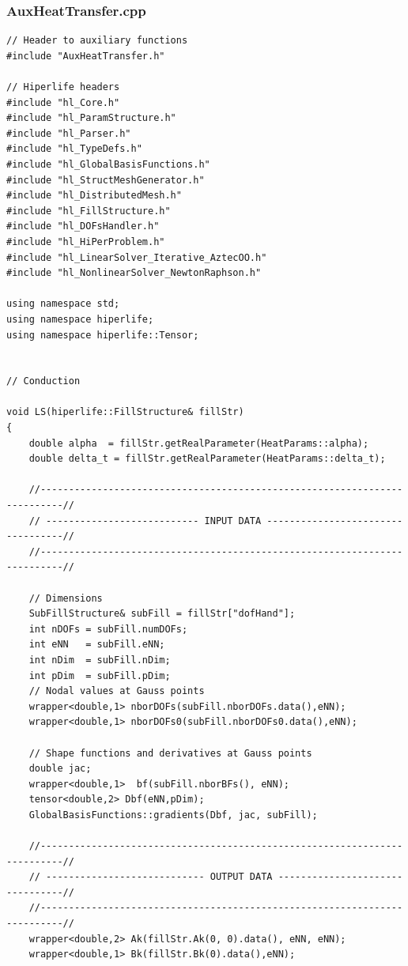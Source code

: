\documentclass[]{article}
\begin{document}
\subsubsection{AuxHeatTransfer.cpp} \label{sec: a.cpp}
\begin{lstlisting}
// Header to auxiliary functions
#include "AuxHeatTransfer.h"

// Hiperlife headers
#include "hl_Core.h"
#include "hl_ParamStructure.h"
#include "hl_Parser.h"
#include "hl_TypeDefs.h"                                                                         
#include "hl_GlobalBasisFunctions.h"                             
#include "hl_StructMeshGenerator.h"                                                                             
#include "hl_DistributedMesh.h"                                           
#include "hl_FillStructure.h"                                             
#include "hl_DOFsHandler.h"          
#include "hl_HiPerProblem.h"         
#include "hl_LinearSolver_Iterative_AztecOO.h"
#include "hl_NonlinearSolver_NewtonRaphson.h"

using namespace std;
using namespace hiperlife;
using namespace hiperlife::Tensor;


// Conduction

void LS(hiperlife::FillStructure& fillStr)
{
	double alpha  = fillStr.getRealParameter(HeatParams::alpha);
	double delta_t = fillStr.getRealParameter(HeatParams::delta_t);
	
	//--------------------------------------------------------------------------//
	// --------------------------- INPUT DATA ----------------------------------//
	//--------------------------------------------------------------------------//
	
	// Dimensions
	SubFillStructure& subFill = fillStr["dofHand"];
	int nDOFs = subFill.numDOFs;                                        
	int eNN   = subFill.eNN;                                           
	int nDim  = subFill.nDim;                                        
	int pDim  = subFill.pDim;
	// Nodal values at Gauss points
	wrapper<double,1> nborDOFs(subFill.nborDOFs.data(),eNN);
	wrapper<double,1> nborDOFs0(subFill.nborDOFs0.data(),eNN);
	
	// Shape functions and derivatives at Gauss points
	double jac; 
	wrapper<double,1>  bf(subFill.nborBFs(), eNN);
	tensor<double,2> Dbf(eNN,pDim); 
	GlobalBasisFunctions::gradients(Dbf, jac, subFill);
	
	//--------------------------------------------------------------------------//
	// ---------------------------- OUTPUT DATA --------------------------------//
	//--------------------------------------------------------------------------//
	wrapper<double,2> Ak(fillStr.Ak(0, 0).data(), eNN, eNN);
	wrapper<double,1> Bk(fillStr.Bk(0).data(),eNN);
	

\end{lstlisting}
\end{document}
